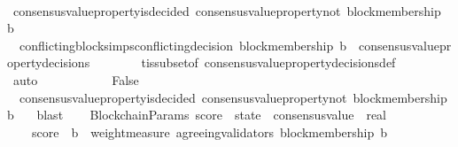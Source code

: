 \begin{isabellebody}
\ \ \isamarkupfalse%
\ {\isachardoublequoteopen}consensus{\isacharunderscore}value{\isacharunderscore}property{\isacharunderscore}is{\isacharunderscore}decided\ {\isacharparenleft}consensus{\isacharunderscore}value{\isacharunderscore}property{\isacharunderscore}not\ {\isacharparenleft}block{\isacharunderscore}membership\ b{}{\isacharparenright}{\isacharcomma}\ {\isasymsigma}{}{\isacharparenright}{\isachardoublequoteclose}\isanewline
\ \ \ \ \isamarkupfalse%
\ \ conflicting{\isacharunderscore}blocks{\isacharunderscore}imps{\isacharunderscore}conflicting{\isacharunderscore}decision\ {\isacartoucheopen}block{\isacharunderscore}membership\ b{}\ {\isasymin}\ consensus{\isacharunderscore}value{\isacharunderscore}property{\isacharunderscore}decisions\ {\isasymsigma}{}{\isacartoucheclose}\ \isanewline
\ \ \ \ \isamarkupfalse%
\ {\isasymSigma}t{\isacharunderscore}is{\isacharunderscore}subset{\isacharunderscore}of{\isacharunderscore}{\isasymSigma}\ consensus{\isacharunderscore}value{\isacharunderscore}property{\isacharunderscore}decisions{\isacharunderscore}def\ \isamarkupfalse%
\ auto\ \ \ \ \ \ \isanewline
\ \ \isamarkupfalse%
\ \isamarkupfalse%
\ False\isanewline
\ \ \ \ \ \isamarkupfalse%
\ {\isacartoucheopen}{\isasymnot}\ consensus{\isacharunderscore}value{\isacharunderscore}property{\isacharunderscore}is{\isacharunderscore}decided\ {\isacharparenleft}consensus{\isacharunderscore}value{\isacharunderscore}property{\isacharunderscore}not\ {\isacharparenleft}block{\isacharunderscore}membership\ b{}{\isacharparenright}{\isacharcomma}\ {\isasymsigma}{}{\isacharparenright}{\isacartoucheclose}\ \isamarkupfalse%
\ blast\isanewline
\ \isamarkupfalse%
%
\endisatagproof
{\isafoldproof}%
%
\isadelimproof
\isanewline
%
\endisadelimproof
\isanewline
\isanewline
\isanewline
\isanewline
\isanewline
\isanewline
{}\isamarkupfalse%
\ {\isacharparenleft}\ BlockchainParams{\isacharparenright}\ score\ {\isacharcolon}{\isacharcolon}\ {\isachardoublequoteopen}state\ {\isasymRightarrow}\ consensus{\isacharunderscore}value\ {\isasymRightarrow}\ real{\isachardoublequoteclose}\isanewline
\ \ \isanewline
\ \ \ \ {\isachardoublequoteopen}score\ {\isasymsigma}\ b\ {\isacharequal}\ weight{\isacharunderscore}measure\ {\isacharparenleft}agreeing{\isacharunderscore}validators\ {\isacharparenleft}block{\isacharunderscore}membership\ b{\isacharcomma}\ {\isasymsigma}{\isacharparenright}{\isacharparenright}{\isachardoublequoteclose}\ \ \isanewline

\end{isabellebody}
